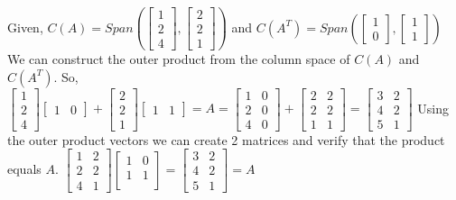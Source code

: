 \documentclass[]{exam}
\begin{document}
\begin{questions}
\begin{solution}
	Given, $C(A)=Span \left( 
	\begin{bmatrix}
	1 \\ 2 \\ 4
	\end{bmatrix}
	,
	\begin{bmatrix}
	2 \\ 2 \\ 1
	\end{bmatrix}
	\right)$
	and 
	$C(A^T)=Span \left( 
	\begin{bmatrix}
	1 \\ 0
	\end{bmatrix}
	,
	\begin{bmatrix}
	1 \\ 1
	\end{bmatrix}
	\right)$
	We can construct the outer product from the column space of $C(A)$ and $C(A^T)$. So,
	\newline
	$
	\begin{bmatrix}
	1 \\ 2 \\ 4
	\end{bmatrix}
	\begin{bmatrix}
	1 & 0
	\end{bmatrix}
	+
	\begin{bmatrix}
	2 \\ 2 \\ 1
	\end{bmatrix}
	\begin{bmatrix}
	1 & 1
	\end{bmatrix}
	=A=
	\begin{bmatrix}
	1 & 0 \\
	2 & 0 \\
	4 & 0
	\end{bmatrix}
	+
	\begin{bmatrix}
	2 & 2 \\
	2 & 2 \\
	1 & 1
	\end{bmatrix}
	=
	\begin{bmatrix}
	3 & 2 \\
	4 & 2 \\
	5 & 1
	\end{bmatrix}
	$
	\newline
	Using the outer product vectors we can create 2 matrices and verify that the product equals $A$.
	$
	\begin{bmatrix}
	1 & 2 \\
	2 & 2 \\
	4 & 1
	\end{bmatrix}
	\begin{bmatrix}
	1 & 0 \\
	1 & 1 \\
	\end{bmatrix}
	=
	\begin{bmatrix}
	3 & 2 \\
	4 & 2 \\
	5 & 1
	\end{bmatrix}
	=A
	$
\end{solution}
	

\end{questions}
\end{document}
